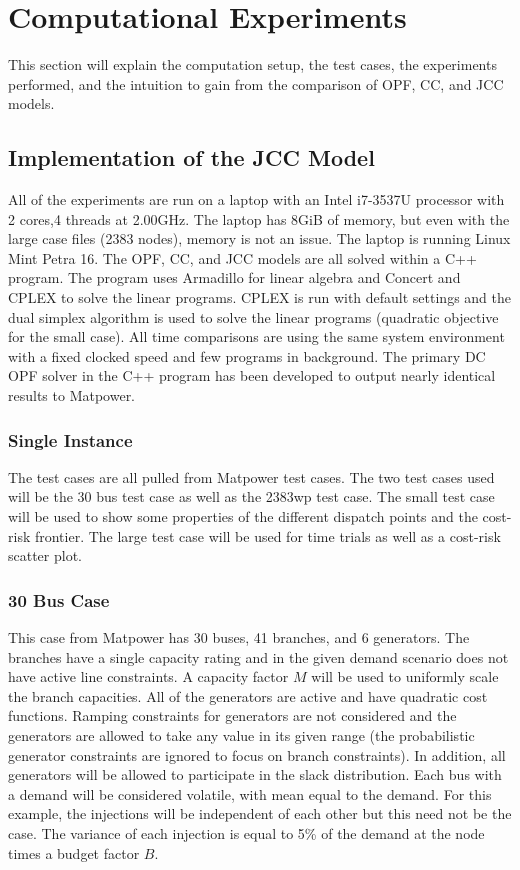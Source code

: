 \section{Computational Experiments}
This section will explain the computation setup, the test cases, the experiments performed, and the intuition to gain from the comparison of OPF, CC, and JCC models.
\subsection{Implementation of the JCC Model}
All of the experiments are run on a laptop with an Intel i7-3537U processor with 2 cores,4 threads at 2.00GHz.  The laptop has 8GiB of memory, but even with the large case files (2383 nodes), memory is not an issue.  The laptop is running Linux Mint Petra 16.  The OPF, CC, and JCC models are all solved within a C++ program.  The program uses Armadillo\cite{armadillo} for linear algebra and Concert and CPLEX to solve the linear programs.  CPLEX is run with default settings and the dual simplex algorithm is used to solve the linear programs (quadratic objective for the small case).  All time comparisons are using the same system environment with a fixed clocked speed and few programs in background.  The primary DC OPF solver in the C++ program has been developed to output nearly identical results to Matpower.\cite{matpower} 
\subsubsection{Single Instance}
The test cases are all pulled from Matpower test cases.  The two test cases used will be the 30 bus test case as well as the 2383wp test case.  The small test case will be used to show some properties of the different dispatch points and the cost-risk frontier.  The large test case will be used for time trials as well as a cost-risk scatter plot.  

\subsubsection*{30 Bus Case}
This case from Matpower has 30 buses, 41 branches, and 6 generators.  The branches have a single capacity rating and in the given demand scenario does not have active line constraints.  A capacity factor $M$ will be used to uniformly scale the branch capacities.  All of the generators are active and have quadratic cost functions.  Ramping constraints for generators are not considered and the generators are allowed to take any value in its given range (the probabilistic generator constraints are ignored to focus on branch constraints).  In addition, all generators will be allowed to participate in the slack distribution.  Each bus with a demand will be considered volatile, with mean equal to the demand.  For this example, the injections will be independent of each other but this need not be the case.  The variance of each injection is equal to 5\% of the demand at the node times a budget factor $B$.


